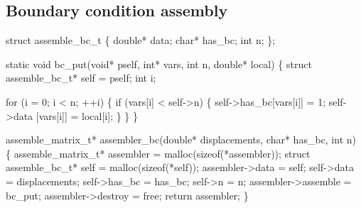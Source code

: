 \nwendcode{}\nwdocspar



\subsection{Boundary condition assembly}

\nwenddocs{}\plusendmoddef
struct assemble_bc_t \{
    double* data;
    char*   has_bc;
    int     n;
\};

\nwendcode{}\nwdocspar

\nwenddocs{}\plusendmoddef
static void bc_put(void* pself, int* vars, int n, double* local)
\{
    struct assemble_bc_t* self = pself;
    int i;

    for (i = 0; i < n; ++i) \{
        if (vars[i] < self->n) \{
            self->has_bc[vars[i]] = 1;
            self->data  [vars[i]] = local[i];
        \}
    \}
\}

\nwendcode{}\nwdocspar

\nwenddocs{}\plusendmoddef
assemble_matrix_t* assembler_bc(double* displacements, char* has_bc, int n)
\{
    assemble_matrix_t* assembler = malloc(sizeof(*assembler));
    struct assemble_bc_t* self = malloc(sizeof(*self));
    assembler->data = self;
    self->data          = displacements;
    self->has_bc        = has_bc;
    self->n             = n;
    assembler->assemble = bc_put;
    assembler->destroy  = free;
    return assembler;
\}

\nwendcode{}

%
%
%
%
%
%
\nwdocspar
\nwenddocs{}
